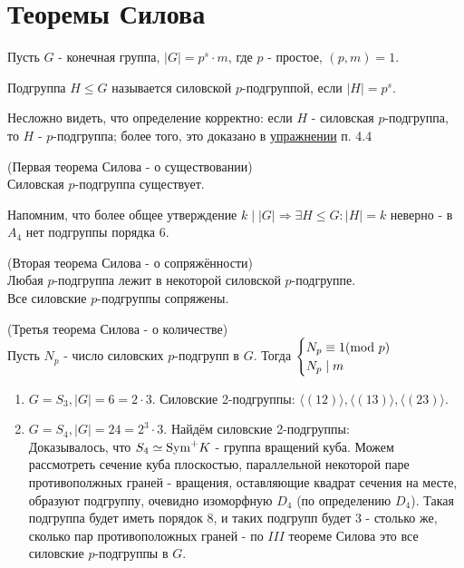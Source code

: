 \section{Теоремы Силова}
Пусть $G$ - конечная группа, $|G| = p^s \cdot m$, где $p$ - простое, $(p, m) = 1$.
\begin{definition}
    Подгруппа $H \leq G$ называется силовской $p$-подгруппой, если $|H| = p^s$.
\end{definition}
\begin{remark}
    Несложно видеть, что определение корректно: если $H$ - силовская $p$-подгруппа, то $H$ - $p$-подгруппа; более того, это доказано в \hyperref[ex:ex1]{упражнении} п. 4.4
\end{remark}
\begin{theoremnum}(Первая теорема Силова - о существовании)\\
    Силовская $p$-подгруппа существует.   
\end{theoremnum}
\begin{remark}
    Напомним, что более общее утверждение $k \mid |G| \Longrightarrow \exists H \leq G: |H| = k$ неверно - в $A_4$ нет подгруппы порядка 6.
\end{remark}
\begin{theoremnum}(Вторая теорема Силова - о сопряжённости)\\
    Любая $p$-подгруппа лежит в некоторой силовской $p$-подгруппе.\\
    Все силовские $p$-подгруппы сопряжены.
\end{theoremnum}
\begin{theoremnum}(Третья теорема Силова - о количестве)\\
    Пусть $N_p$ - число силовских $p$-подгрупп в $G$. Тогда $\begin{cases}
        N_p \equiv 1(\textup{mod } p) \\
        N_p \mid m
    \end{cases}$
\end{theoremnum}
\begin{examples}\tab
    \begin{enumerate}
        \item $G = S_3, |G| = 6 = 2\cdot 3$. Силовские 2-подгруппы: $\langle (12) \rangle, \langle (13) \rangle, \langle (23) \rangle$.
        \item $G = S_4, |G| = 24 = 2^3\cdot 3$. Найдём силовские 2-подгруппы:\\
        Доказывалось, что $S_4 \simeq \textup{Sym}^+ K$ - группа вращений куба. Можем рассмотреть сечение куба плоскостью, параллельной некоторой паре противополжных граней - вращения, оставляющие квадрат сечения на месте, образуют подгруппу, очевидно изоморфную $D_4$ (по определению $D_4$). Такая подгруппа будет иметь порядок 8, и таких подгрупп будет 3 - столько же, сколько пар противоположных граней - по $III$ теореме Силова это все силовские $p$-подгруппы в $G$.
    \end{enumerate}
\end{examples}
